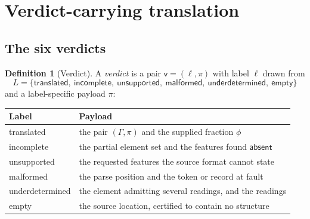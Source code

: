 \documentclass[11pt,twocolumn,a4paper]{article}
\theoremstyle{msthm}
\theoremstyle{definition}
\newtheorem{definition}[theorem]{Definition}
\theoremstyle{remark}
\newcommand{\Gph}{\Gamma}
\newcommand{\Prov}{\pi}
\newcommand{\Verd}{\mathsf{v}}
\newcommand{\absent}{\textsf{absent}}
\begin{document}
\section{Verdict-carrying translation}
\label{sec:verdicts}

\subsection{The six verdicts}

\begin{definition}[Verdict]
\label{def:verdict}
A \emph{verdict} is a pair $\Verd=(\ell,\pi)$ with label $\ell$ drawn
from
\[
L=\{\textsf{translated},\ \textsf{incomplete},\
\textsf{unsupported},\ \textsf{malformed},\
\textsf{underdetermined},\ \textsf{empty}\}
\]
and a label-specific payload $\pi$:
\begin{center}
\small
\begin{tabular}{@{}ll@{}}
\toprule
Label & Payload\\
\midrule
\textsf{translated} & the pair $(\Gph,\Prov)$ and the supplied fraction $\phi$\\
\textsf{incomplete} & the partial element set and the features found $\absent$\\
\textsf{unsupported} & the requested features the source format cannot state\\
\textsf{malformed} & the parse position and the token or record at fault\\
\textsf{underdetermined} & the element admitting several readings, and the readings\\
\textsf{empty} & the source location, certified to contain no structure\\
\bottomrule
\end{tabular}
\end{center}
\end{definition}
\end{document}
